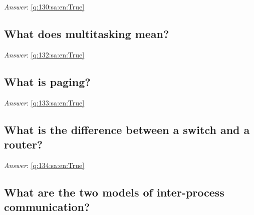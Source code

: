 \documentclass[a4paper,11pt,oneside]{article}
\begin{document}
\begin{sloppypar}
\noindent\makebox[\textwidth]{\hrulefill}

\vspace{1cm}

\textit{Answer}: \autoref{q:130:sa:en:True}



\subsection{What does multitasking mean?}

\label{q:132:sa:en:False}

\vspace{2cm}

\noindent\makebox[\textwidth]{\hrulefill}

\vspace{1cm}

\textit{Answer}: \autoref{q:132:sa:en:True}



\subsection{What is paging?}

\label{q:133:sa:en:False}

\vspace{2cm}

\noindent\makebox[\textwidth]{\hrulefill}

\vspace{1cm}

\textit{Answer}: \autoref{q:133:sa:en:True}



\subsection{What is the difference between a switch and a router?}

\label{q:134:sa:en:False}

\vspace{2cm}

\noindent\makebox[\textwidth]{\hrulefill}

\vspace{1cm}

\textit{Answer}: \autoref{q:134:sa:en:True}



\subsection{What are the two models of inter-process communication?}


\end{sloppypar}
\end{document}
